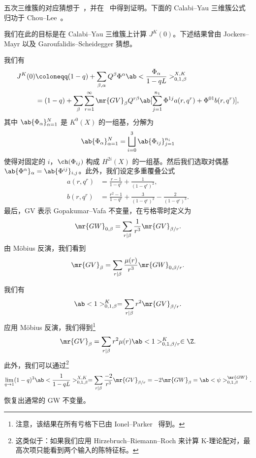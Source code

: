五次三维簇的对应猜想于~\cite{GaroufalidisScheidegger2022}，并在~\cite{ChouLeeQuintic} 中得到证明。下面的 Calabi–Yau 三维簇公式归功于 Chou–Lee~\cite{ChouLee2025}。

我们在此的目标是在 Calabi–Yau 三维簇上计算 \(J^K(0)\)。下述结果曾由 Jockers–Mayr 以及 Garoufalidis–Scheidegger 猜想。

\begin{thm}
    我们有
    \begin{align*}
        J^K(0) &\coloneqq (1-q) + \sum_{\beta, \alpha} Q^{\beta} \Phi^{\alpha} \ab<\frac{\Phi_{\alpha}}{1-qL}>_{0,1,\beta}^{X,K} \\
        &= (1-q) + \sum_{\beta} \sum_{r=1}^{\infty} \mr{GV}_{\beta} Q^{r\beta} \ab[\sum_{j=1}^{n_1} \Phi^{1j} a(r, q^r) + \Phi^{01} b(r, q^r)],
    \end{align*}
    其中 \(\ab\{\Phi_{\alpha}\}_{\alpha=1}^N\) 是 \(K^0(X)\) 的一组基，分解为
    \[ \ab\{\Phi_{\alpha}\}_{\alpha=1}^N = \bigsqcup_{i=0}^3 \ab\{\Phi_{ij}\}_{j=1}^{n_i} \]
    使得对固定的 \(i\)，\(\ch(\Phi_{ij})\) 构成 \(H^{2i}(X)\) 的一组基。然后我们选取对偶基 \(\ab\{\Phi^{\alpha}\}_{\alpha} = \ab\{\Phi^{ij}\}_{i,j}\)。此外，我们设定多重覆叠公式
    \begin{align*}
        a(r, q^r) &= \frac{r-1}{1-q^r} + \frac{1}{(1-q^r)^2}, \\
        b(r, q^r) &= \frac{r^2-1}{1-q^r} + \frac{3}{(1-q^r)^2} - \frac{2}{(1-q^r)^3}.
    \end{align*}
    最后，GV 表示 Gopakumar–Vafa 不变量，在亏格零时定义为
    \[ \mr{GW}_{0,\beta} = \sum_{r \mid \beta} \frac{1}{r^3} \mr{GV}_{\beta/r}. \]
    由 M\"obius 反演，我们看到
    \[ \mr{GV}_{\beta} = \sum_{r \mid \beta} \frac{\mu(r)}{r^3} \mr{GW}_{0,\beta/r}. \]
\end{thm}

\begin{cor}
    我们有
    \[ \ab<1>_{0,1,\beta}^K = \sum_{r \mid \beta} r^2 \mr{GV}_{\beta/r}. \]
    应用 M\"obius 反演，我们得到\footnote{注意，该结果在所有亏格下已由 Ionel–Parker~\cite{IonelParker2018} 得到。}
    \[ \mr{GV}_{\beta} = \sum_{r \mid \beta} r^2 \mu(r) \ab<1>_{0,1,\beta/r}^K \in \Z. \]
    此外，我们可以通过\footnote{这类似于：如果我们应用 Hirzebruch–Riemann–Roch 来计算 K-理论配对，最高次项只能看到两个输入的陈特征标。}
    \[ \lim_{q \to 1} (1-q)^3 \ab<\frac{1}{1-qL}>_{0,1,\beta}^{X,K} = \sum_{r \mid \beta} \frac{-2}{r^3} \mr{GV}_{\beta/r} = -2 \mr{GW}_{\beta} = \ab<\psi>_{0,1,\beta}^{\mr{GW}}. \]
    恢复出通常的 GW 不变量。
\end{cor}


